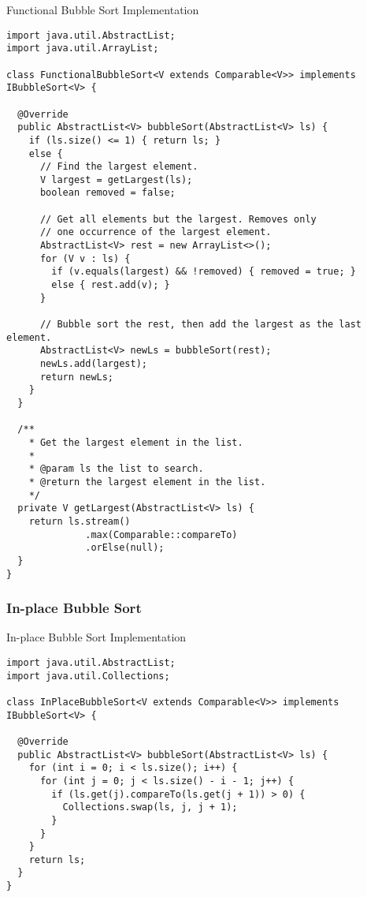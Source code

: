 \begin{cl}{Functional Bubble Sort Implementation}
\begin{lstlisting}[language=MyJava]
import java.util.AbstractList;
import java.util.ArrayList;

class FunctionalBubbleSort<V extends Comparable<V>> implements IBubbleSort<V> {

  @Override
  public AbstractList<V> bubbleSort(AbstractList<V> ls) {
    if (ls.size() <= 1) { return ls; }
    else {
      // Find the largest element.
      V largest = getLargest(ls);
      boolean removed = false;

      // Get all elements but the largest. Removes only
      // one occurrence of the largest element.
      AbstractList<V> rest = new ArrayList<>();
      for (V v : ls) {
        if (v.equals(largest) && !removed) { removed = true; }
        else { rest.add(v); }
      }

      // Bubble sort the rest, then add the largest as the last element.
      AbstractList<V> newLs = bubbleSort(rest);
      newLs.add(largest);
      return newLs;
    }
  }

  /**
    * Get the largest element in the list.
    *
    * @param ls the list to search.
    * @return the largest element in the list.
    */
  private V getLargest(AbstractList<V> ls) {
    return ls.stream()
              .max(Comparable::compareTo)
              .orElse(null);
  }
}
\end{lstlisting}
\end{cl}

\subsubsection*{In-place Bubble Sort}
\begin{cl}{In-place Bubble Sort Implementation}
\begin{lstlisting}[language=MyJava]
import java.util.AbstractList;
import java.util.Collections;

class InPlaceBubbleSort<V extends Comparable<V>> implements IBubbleSort<V> {

  @Override
  public AbstractList<V> bubbleSort(AbstractList<V> ls) {
    for (int i = 0; i < ls.size(); i++) {
      for (int j = 0; j < ls.size() - i - 1; j++) {
        if (ls.get(j).compareTo(ls.get(j + 1)) > 0) {
          Collections.swap(ls, j, j + 1);
        }
      }
    }
    return ls;
  }
}
\end{lstlisting}
\end{cl}

